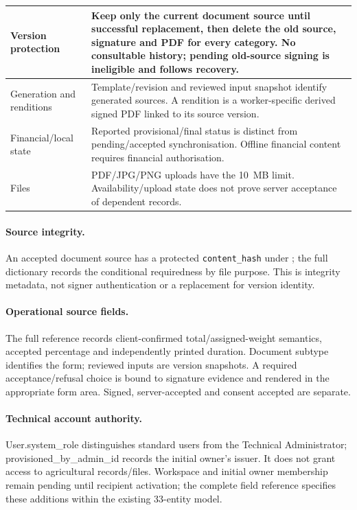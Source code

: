 {\begin{longtable}{L{0.31}L{0.69}}
\midrule
Version protection & Keep only the current document source until successful replacement, then delete the old source, signature and PDF for every category. No consultable history; pending old-source signing is ineligible and follows  recovery. \\
\midrule
Generation and renditions & Template/revision and reviewed input snapshot identify generated sources. A rendition is a worker-specific derived signed PDF linked to its source version. \\
\midrule
Financial/local state & Reported provisional/final status is distinct from pending/accepted synchronisation. Offline financial content requires financial authorisation. \\
\midrule
Files & PDF/JPG/PNG uploads have the 10~MB limit. Availability/upload state does not prove server acceptance of dependent records. \\
\end{longtable}}

\paragraph{Source integrity.}
An accepted document source has a protected \texttt{content\_hash} under ;
the full dictionary records the conditional requiredness by file purpose. This is
integrity metadata, not signer authentication or a replacement for version identity.

\paragraph{Operational source fields.}
The full reference records client-confirmed total/assigned-weight semantics, accepted percentage and independently printed duration.
Document subtype identifies the form; reviewed inputs are version snapshots. A
required acceptance/refusal choice is bound to signature evidence and rendered in
the appropriate form area. Signed, server-accepted and consent accepted are separate.

\paragraph{Technical account authority.}
User.system\_role distinguishes standard users from the Technical Administrator;
provisioned\_by\_admin\_id records the initial owner's issuer. It does not grant
access to agricultural records/files. Workspace and initial owner membership
remain pending until recipient activation; the complete field reference specifies
these additions within the existing 33-entity model.
